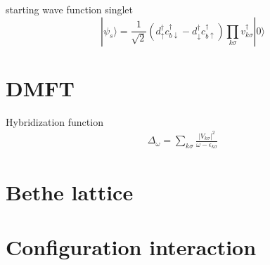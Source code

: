 starting wave function singlet
\begin{equation}
    |\psi_s\rangle
    =
    \frac{1}{\sqrt{2}}
    (d^\dag_\uparrow c^\dag_{b\downarrow} - d^\dag_\downarrow c^\dag_{b\uparrow})
    \prod_{k\sigma} v^\dag_{k\sigma}
    |0\rangle
\end{equation}

\section{DMFT}

Hybridization function
\begin{align}
    \Delta_\omega = \sum_{k\sigma} \frac{|V_{k\sigma}|^2}{\omega - \epsilon_{k\sigma}}
\end{align}

\section{Bethe lattice}

\section{Configuration interaction}
